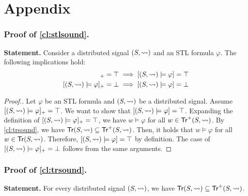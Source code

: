 \section*{Appendix}
\subsubsection*{Proof of \cref{cl:stlsound}.}
\textbf{Statement.}
Consider a distributed signal $(S,{\rightsquigarrow})$ and an STL formula $\varphi$.
The following implications hold:
\begin{align*}
	[(S,{\hb}) \models \varphi]_+ = \top &\implies [(S,{\hb}) \models \varphi] = \top \\
	[(S,{\hb}) \models \varphi]_+ = \bot &\implies [(S,{\hb}) \models \varphi] = \bot \\
\end{align*}

\begin{proof}[\normalsize Proof.]
	\normalsize
	Let $\varphi$ be an STL formula and $(S,{\rightsquigarrow})$ be a distributed signal.
	Assume $[(S,{\rightsquigarrow}) \models \varphi]_+ = \top$.
	We want to show that $[(S,{\rightsquigarrow}) \models \varphi] = \top$.
	Expanding the definition of $[(S,{\rightsquigarrow}) \models \varphi]_+ = \top$, we have $w \models \varphi$ for all $w \in \mathsf{Tr}^+(S,{\rightsquigarrow})$.
	By \cref{cl:trsound}, we have $\mathsf{Tr}(S,{\rightsquigarrow}) \subseteq \mathsf{Tr}^+(S,{\rightsquigarrow})$.
	Then, it holds that $w \models \varphi$ for all $w \in \mathsf{Tr}(S,{\rightsquigarrow})$.
	Therefore, $[(S,{\rightsquigarrow}) \models \varphi] = \top$ by definition.
	The case of $[(S,{\rightsquigarrow}) \models \varphi]_+ = \bot$ follows from the same arguments.
\end{proof}

\subsubsection*{Proof of \cref{cl:trsound}.}
\textbf{Statement.}
For every distributed signal $(S,{\rightsquigarrow})$, we have $\mathsf{Tr}(S,{\rightsquigarrow}) \subseteq \mathsf{Tr}^+(S,{\rightsquigarrow})$.

